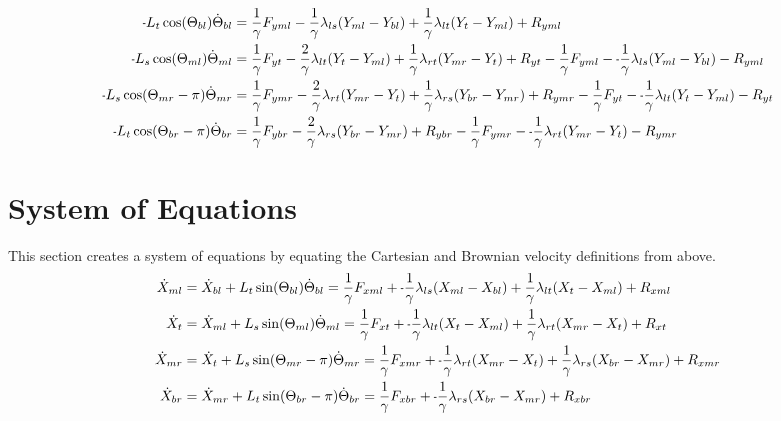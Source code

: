 \documentclass[11pt, landscape]{article}
\newcommand{\mn}{\scalebox{0.7}[1.0]{-}}
\begin{document}
\begin{align}
  \mn L_{t}\cos(\Theta_{bl})      \dot{\Theta}_{bl} &= \frac{1}{\gamma}F_{yml} - \frac{1}{\gamma}\lambda_{ls}(Y_{ml} - Y_{bl}) + \frac{1}{\gamma}\lambda_{lt}(Y_{t } - Y_{ml}) + R_{yml} \\
  \mn L_{s}\cos(\Theta_{ml})      \dot{\Theta}_{ml} &= \frac{1}{\gamma}F_{yt } - \frac{2}{\gamma}\lambda_{lt}(Y_{t } - Y_{ml}) + \frac{1}{\gamma}\lambda_{rt}(Y_{mr} - Y_{t }) + R_{yt } - \frac{1}{\gamma}F_{yml} - \mn \frac{1}{\gamma}\lambda_{ls}(Y_{ml} - Y_{bl}) - R_{yml}\\
  \mn L_{s}\cos(\Theta_{mr}-\pi)  \dot{\Theta}_{mr} &= \frac{1}{\gamma}F_{ymr} - \frac{2}{\gamma}\lambda_{rt}(Y_{mr} - Y_{t }) + \frac{1}{\gamma}\lambda_{rs}(Y_{br} - Y_{mr}) + R_{ymr} - \frac{1}{\gamma}F_{yt } - \mn \frac{1}{\gamma}\lambda_{lt}(Y_{t } - Y_{ml}) - R_{yt } \\
  \mn L_{t}\cos(\Theta_{br}-\pi)  \dot{\Theta}_{br} &= \frac{1}{\gamma}F_{ybr} - \frac{2}{\gamma}\lambda_{rs}(Y_{br} - Y_{mr}) + R_{ybr} - \frac{1}{\gamma}F_{ymr} - \mn \frac{1}{\gamma}\lambda_{rt}(Y_{mr} - Y_{t }) - R_{ymr} 
\end{align}
  
\section{System of Equations}
This section creates a system of equations by equating the Cartesian and Brownian velocity definitions from above. \\

\begin{align}  
  \dot{X}_{ml} &= \dot{X}_{bl} + L_{t}\sin(\Theta_{bl})      \dot{\Theta}_{bl} = \frac{1}{\gamma}F_{xml} + \mn\frac{1}{\gamma}\lambda_{ls}(X_{ml} - X_{bl}) + \frac{1}{\gamma}\lambda_{lt}(X_{t } - X_{ml}) + R_{xml} \\
  \dot{X}_{t}  &= \dot{X}_{ml} + L_{s}\sin(\Theta_{ml})      \dot{\Theta}_{ml} = \frac{1}{\gamma}F_{xt } + \mn\frac{1}{\gamma}\lambda_{lt}(X_{t } - X_{ml}) + \frac{1}{\gamma}\lambda_{rt}(X_{mr} - X_{t }) + R_{xt } \\
  \dot{X}_{mr} &= \dot{X}_{t } + L_{s}\sin(\Theta_{mr}-\pi)  \dot{\Theta}_{mr} = \frac{1}{\gamma}F_{xmr} + \mn\frac{1}{\gamma}\lambda_{rt}(X_{mr} - X_{t }) + \frac{1}{\gamma}\lambda_{rs}(X_{br} - X_{mr}) + R_{xmr} \\
  \dot{X}_{br} &= \dot{X}_{mr} + L_{t}\sin(\Theta_{br}-\pi)  \dot{\Theta}_{br} = \frac{1}{\gamma}F_{xbr} + \mn\frac{1}{\gamma}\lambda_{rs}(X_{br} - X_{mr}) + R_{xbr}
\end{align}
\end{document}
